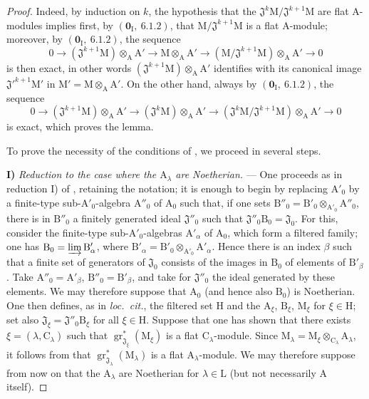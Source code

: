 \begin{proof}

Indeed, by induction on $k$, the hypothesis that the $\mathfrak{J}^k\mathrm{M}/\mathfrak{J}^{k+1}\mathrm{M}$ are flat A-modules implies first, by $(\mathbf{0}_\mathrm{I},~6.1.2)$, that $\mathrm{M}/\mathfrak{J}^{k+1}\mathrm{M}$ is a flat A-module; moreover, by $(\mathbf{0}_\mathrm{I},~6.1.2)$, the sequence
\[
  0\to(\mathfrak{J}^{k+1}\mathrm{M})\otimes_\mathrm{A}\mathrm{A}'\to\mathrm{M}\otimes_\mathrm{A}\mathrm{A}'\to(\mathrm{M}/\mathfrak{J}^{k+1}\mathrm{M})\otimes_\mathrm{A}\mathrm{A}'\to 0
\]
is then exact, in other words $(\mathfrak{J}^{k+1}\mathrm{M})\otimes_\mathrm{A}\mathrm{A}'$ identifies with its canonical image $\mathfrak{J}'^{k+1}\mathrm{M}'$ in $\mathrm{M}'=\mathrm{M}\otimes_\mathrm{A}\mathrm{A}'$. On the other hand, always by $(\mathbf{0}_\mathrm{I},~6.1.2)$, the sequence
\[
  0\to(\mathfrak{J}^{k+1}\mathrm{M})\otimes_\mathrm{A}\mathrm{A}'\to(\mathfrak{J}^k\mathrm{M})\otimes_\mathrm{A}\mathrm{A}'\to(\mathfrak{J}^k\mathrm{M}/\mathfrak{J}^{k+1}\mathrm{M})\otimes_\mathrm{A}\mathrm{A}'\to 0
\]
is exact, which proves the lemma.

To prove the necessity of the conditions of , we proceed in several steps.

\medskip
\noindent\textbf{I)} \emph{Reduction to the case where the $\mathrm{A}_\lambda$ are Noetherian.} --- One proceeds as in reduction I) of , retaining the notation; it is enough to begin by replacing $\mathrm{A}'_0$ by a finite-type sub-$\mathrm{A}'_0$-algebra $\mathrm{A}''_0$ of $\mathrm{A}_0$ such that, if one sets $\mathrm{B}''_0=\mathrm{B}'_0\otimes_{\mathrm{A}'_0}\mathrm{A}''_0$, there is in $\mathrm{B}''_0$ a finitely generated ideal $\mathfrak{J}''_0$ such that $\mathfrak{J}''_0\mathrm{B}_0=\mathfrak{J}_0$. For this, consider the finite-type sub-$\mathrm{A}'_0$-algebras $\mathrm{A}'_\alpha$ of $\mathrm{A}_0$, which form a filtered family; one has $\mathrm{B}_0=\varinjlim\mathrm{B}'_\alpha$, where $\mathrm{B}'_\alpha=\mathrm{B}'_0\otimes_{\mathrm{A}'_0}\mathrm{A}'_\alpha$. Hence there is an index $\beta$ such that a finite set of generators of $\mathfrak{J}_0$ consists of the images in $\mathrm{B}_0$ of elements of $\mathrm{B}'_\beta$. Take $\mathrm{A}''_0=\mathrm{A}'_\beta$, $\mathrm{B}''_0=\mathrm{B}'_\beta$, and take for $\mathfrak{J}''_0$ the ideal generated by these elements. We may therefore suppose that $\mathrm{A}_0$ (and hence also $\mathrm{B}_0$) is Noetherian. One then defines, as in \emph{loc.\ cit.}, the filtered set $\mathrm{H}$ and the $\mathrm{A}_\xi$, $\mathrm{B}_\xi$, $\mathrm{M}_\xi$ for $\xi\in\mathrm{H}$; set also $\mathfrak{J}_\xi=\mathfrak{J}''_0\mathrm{B}_\xi$ for all $\xi\in\mathrm{H}$. Suppose that one has shown that there exists $\xi=(\lambda,\mathrm{C}_\lambda)$ such that $\operatorname{gr}^*_{\mathfrak{J}_\xi}(\mathrm{M}_\xi)$ is a flat $\mathrm{C}_\lambda$-module. Since $\mathrm{M}_\lambda=\mathrm{M}_\xi\otimes_{\mathrm{C}_\lambda}\mathrm{A}_\lambda$, it follows from  that $\operatorname{gr}^*_{\mathfrak{J}_\lambda}(\mathrm{M}_\lambda)$ is a flat $\mathrm{A}_\lambda$-module. We may therefore suppose from now on that the $\mathrm{A}_\lambda$ are Noetherian for $\lambda\in\mathrm{L}$ (but not necessarily $\mathrm{A}$ itself).


\end{proof}
